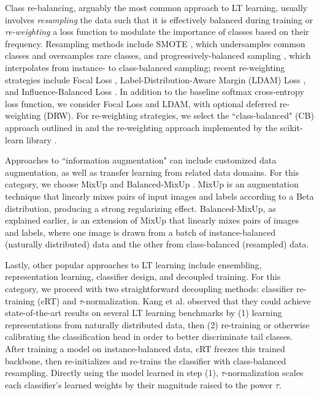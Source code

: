 \documentclass[runningheads]{llncs}
\begin{document}
Class re-balancing, arguably the most common approach to LT learning, usually involves \textit{resampling} the data such that it is effectively balanced during training or \textit{re-weighting} a loss function to modulate the importance of classes based on their frequency. Resampling methods include SMOTE \cite{chawla2002smote}, which undersamples common classes and oversamples rare classes, and progressively-balanced sampling \cite{kangdecoupling2020}, which interpolates from instance- to class-balanced sampling; recent re-weighting strategies include Focal Loss \cite{linfocal2017}, Label-Distribution-Aware Margin (LDAM) Loss \cite{caolearning2019}, and Influence-Balanced Loss \cite{park2021influence}. In addition to the baseline softmax cross-entropy loss function, we consider Focal Loss and LDAM, with optional deferred re-weighting (DRW). For re-weighting strategies, we select the ``class-balanced" (CB) approach outlined in \cite{cuiclass2019} and the re-weighting approach implemented by the scikit-learn library \cite{scikit-learn}.

Approaches to ``information augmentation" can include customized data augmentation, as well as transfer learning from related data domains. For this category, we choose MixUp \cite{zhang2018mixup} and Balanced-MixUp \cite{galdranbalanced2021}. MixUp is an augmentation technique that linearly mixes pairs of input images and labels according to a Beta distribution, producing a strong regularizing effect. Balanced-MixUp, as explained earlier, is an extension of MixUp that linearly mixes pairs of images and labels, where one image is drawn from a batch of instance-balanced (naturally distributed) data and the other from class-balanced (resampled) data.

Lastly, other popular approaches to LT learning include ensembling, representation learning, classifier design, and decoupled training. For this category, we proceed with two straightforward decoupling methods: classifier re-training (cRT) and $\tau$-normalization. Kang et al. \cite{kangdecoupling2020} observed that they could achieve state-of-the-art results on several LT learning benchmarks by (1) learning representations from naturally distributed data, then (2) re-training or otherwise calibrating the classification head in order to better discriminate tail classes. After training a model on instance-balanced data, cRT freezes this trained backbone, then re-initializes and re-trains the classifier with class-balanced resampling. Directly using the model learned in step (1), $\tau$-normalization scales each classifier's learned weights by their magnitude raised to the power $\tau$.
\end{document}
